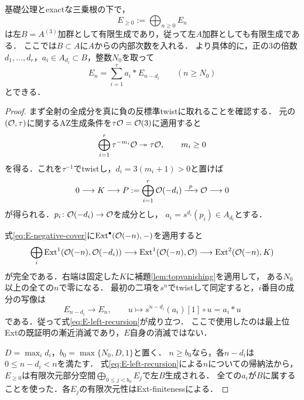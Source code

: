 \documentclass[11pt,a4paper]{ltjsarticle}
\begin{document}
\begin{proposition}[正次数部分の左有限生成]\label{prop:E-left-finite}
基礎公理とexactな三乗根の下で，
\[
 E_{\geq0}:=\bigoplus_{n\geq0}E_n
\]
は左$B=A^{(3)}$加群として有限生成であり，従って左$A$加群としても有限生成である．
ここでは$B\subset A$に$A$からの内部次数を入れる．
より具体的に，正の3の倍数$d_1,\dots,d_r$，$a_i\in A_{d_i}\subset B$，整数$N_0$を取って
\begin{equation}\label{eq:E-left-recursion}
 E_n=\sum_{i=1}^r a_i*E_{n-d_i}
 \qquad(n\geq N_0)
\end{equation}
とできる．
\end{proposition}
\begin{proof}
まず全射の全成分を真に負の反標準twistに取れることを確認する．
元の$(\mathcal O,\tau)$に関するAZ生成条件を$\tau\mathcal O=\mathcal O(3)$に適用すると
\[
 \bigoplus_{i=1}^r\tau^{-m_i}\mathcal O\twoheadrightarrow\tau\mathcal O,
 \qquad m_i\geq0
\]
を得る．これを$\tau^{-1}$でtwistし，$d_i=3(m_i+1)>0$と置けば
\begin{equation}\label{eq:E-negative-cover}
 0\longrightarrow K\longrightarrow
 P:=\bigoplus_{i=1}^r\mathcal O(-d_i)
 \xrightarrow{\ p\ }\mathcal O\longrightarrow0
\end{equation}
が得られる．$p_i\colon\mathcal O(-d_i)\to\mathcal O$を成分とし，
$a_i=s^{d_i}(p_i)\in A_{d_i}$とする．

式\eqref{eq:E-negative-cover}に$\operatorname{Ext}^\bullet(\mathcal O(-n),-)$を適用すると
\[
 \bigoplus_i\operatorname{Ext}^1(\mathcal O(-n),\mathcal O(-d_i))
 \longrightarrow\operatorname{Ext}^1(\mathcal O(-n),\mathcal O)
 \longrightarrow\operatorname{Ext}^2(\mathcal O(-n),K)
\]
が完全である．右端は固定した$K$に補題\ref{lem:topvanishing}を適用して，
ある$N_0$以上の全ての$n$で零になる．
最初の二項を$s^n$でtwistして同定すると，$i$番目の成分の写像は
\[
 E_{n-d_i}\longrightarrow E_n,
 \qquad u\longmapsto s^{n-d_i}(a_i)[1]\circ u=a_i*u
\]
である．従って式\eqref{eq:E-left-recursion}が成り立つ．
ここで使用したのは最上位Extの既証明の漸近消滅であり，$E$自身の消滅ではない．

$D=\max_i d_i$，$b_0=\max\{N_0,D,1\}$と置く．
$n\geq b_0$なら，各$n-d_i$は$0\leq n-d_i<n$を満たす．
式\eqref{eq:E-left-recursion}による$n$についての帰納法から，
$E_{\geq0}$は有限次元部分空間$\bigoplus_{0\leq j<b_0}E_j$で左$B$生成される．
全ての$a_i$が$B$に属することを使った．各$E_j$の有限次元性はExt-finitenessによる．
\end{proof}
\end{document}
